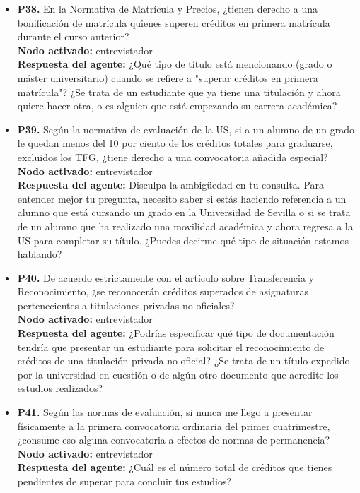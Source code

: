 \documentclass{article}
\begin{document}
\begin{itemize}
      \item \textbf{P38.} En la Normativa de Matrícula y Precios, ¿tienen derecho a una bonificación de matrícula quienes superen créditos en primera matrícula durante el curso anterior? \\
            \textbf{Nodo activado:} entrevistador \\
            \textbf{Respuesta del agente:} ¿Qué tipo de título está mencionando (grado o máster universitario) cuando se refiere a "superar créditos en primera matrícula"? ¿Se trata de un estudiante que ya tiene una titulación y ahora quiere hacer otra, o es alguien que está empezando su carrera académica?

      \item \textbf{P39.} Según la normativa de evaluación de la US, si a un alumno de un grado le quedan menos del 10 por ciento de los créditos totales para graduarse, excluidos los TFG, ¿tiene derecho a una convocatoria añadida especial? \\
            \textbf{Nodo activado:} entrevistador \\
            \textbf{Respuesta del agente:} Disculpa la ambigüedad en tu consulta. Para entender mejor tu pregunta, necesito saber si estás haciendo referencia a un alumno que está cursando un grado en la Universidad de Sevilla o si se trata de un alumno que ha realizado una movilidad académica y ahora regresa a la US para completar su título. ¿Puedes decirme qué tipo de situación estamos hablando?

      \item \textbf{P40.} De acuerdo estrictamente con el artículo sobre Transferencia y Reconocimiento, ¿se reconocerán créditos superados de asignaturas pertenecientes a titulaciones privadas no oficiales? \\
            \textbf{Nodo activado:} entrevistador \\
            \textbf{Respuesta del agente:} ¿Podrías especificar qué tipo de documentación tendría que presentar un estudiante para solicitar el reconocimiento de créditos de una titulación privada no oficial? ¿Se trata de un título expedido por la universidad en cuestión o de algún otro documento que acredite los estudios realizados?

      \item \textbf{P41.} Según las normas de evaluación, si nunca me llego a presentar físicamente a la primera convocatoria ordinaria del primer cuatrimestre, ¿consume eso alguna convocatoria a efectos de normas de permanencia? \\
            \textbf{Nodo activado:} entrevistador \\
            \textbf{Respuesta del agente:} ¿Cuál es el número total de créditos que tienes pendientes de superar para concluir tus estudios?


\end{itemize}
\end{document}
